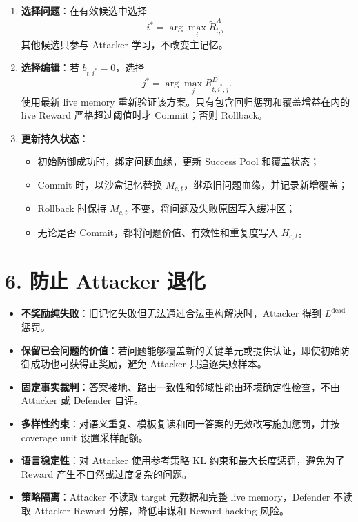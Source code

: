 \documentclass[a4paper,11pt]{article}
\begin{document}
\begin{enumerate}[resume]
    \item \textbf{选择问题}：在有效候选中选择
    \[
        i^*=\arg\max_i\widetilde R^A_{t,i}.
    \]
    其他候选只参与 Attacker 学习，不改变主记忆。

    \item \textbf{选择编辑}：若 $b_{t,i^*}=0$，选择
    \[
        j^*=\arg\max_j R^D_{t,i^*,j}.
    \]
    使用最新 live memory 重新验证该方案。只有包含回归惩罚和覆盖增益在内的 live Reward
    严格超过阈值时才 Commit；否则 Rollback。

    \item \textbf{更新持久状态}：
    \begin{itemize}
        \item 初始防御成功时，绑定问题血缘，更新 Success Pool 和覆盖状态；
        \item Commit 时，以沙盒记忆替换 $M_{c,t}$，继承旧问题血缘，并记录新增覆盖；
        \item Rollback 时保持 $M_{c,t}$ 不变，将问题及失败原因写入缓冲区；
        \item 无论是否 Commit，都将问题价值、有效性和重复度写入 $H_{c,t}$。
    \end{itemize}
\end{enumerate}

\section*{6. 防止 Attacker 退化}

\begin{itemize}
    \item \textbf{不奖励纯失败}：旧记忆失败但无法通过合法重构解决时，Attacker 得到 $L^{\mathrm{dead}}$ 惩罚。
    \item \textbf{保留已会问题的价值}：若问题能够覆盖新的关键单元或提供认证，即使初始防御成功也可获得正奖励，避免 Attacker 只追逐失败样本。
    \item \textbf{固定事实裁判}：答案接地、路由一致性和邻域性能由环境确定性检查，不由 Attacker 或 Defender 自评。
    \item \textbf{多样性约束}：对语义重复、模板复读和同一答案的无效改写施加惩罚，并按 coverage unit 设置采样配额。
    \item \textbf{语言稳定性}：对 Attacker 使用参考策略 KL 约束和最大长度惩罚，避免为了 Reward 产生不自然或过度复杂的问题。
    \item \textbf{策略隔离}：Attacker 不读取 target 元数据和完整 live memory，Defender 不读取 Attacker Reward 分解，降低串谋和 Reward hacking 风险。
\end{itemize}
\end{document}

